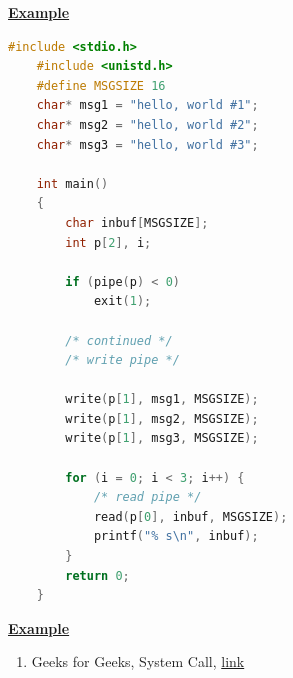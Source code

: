 \documentclass[12pt]{article}
\begin{document}
\begin{enumerate}[1.]
\begin{itemize}
        \bigskip

        \underline{\textbf{Example}}

        \bigskip

\begin{lstlisting}[language=c]
    #include <stdio.h>
    #include <unistd.h>
    #define MSGSIZE 16
    char* msg1 = "hello, world #1";
    char* msg2 = "hello, world #2";
    char* msg3 = "hello, world #3";

    int main()
    {
        char inbuf[MSGSIZE];
        int p[2], i;

        if (pipe(p) < 0)
            exit(1);

        /* continued */
        /* write pipe */

        write(p[1], msg1, MSGSIZE);
        write(p[1], msg2, MSGSIZE);
        write(p[1], msg3, MSGSIZE);

        for (i = 0; i < 3; i++) {
            /* read pipe */
            read(p[0], inbuf, MSGSIZE);
            printf("% s\n", inbuf);
        }
        return 0;
    }
\end{lstlisting}
    \end{itemize}

    \bigskip

    \underline{\textbf{Example}}

    \bigskip

    \begin{enumerate}[1)]
        \item Geeks for Geeks, System Call, \href{https://www.geeksforgeeks.org/pipe-system-call/}{link}
    \end{enumerate}


\end{enumerate}
\end{document}

